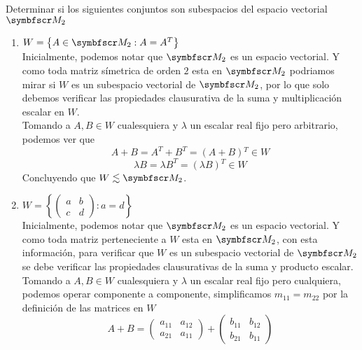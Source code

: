 \item Determinar si los siguientes conjuntos son subespacios del espacio vectorial \(\fm_2\)
    \begin{enumerate}[label=\listAlph]
        \item \(W = \left\{ A \in \fm_2 : A = A^T\right\}\) \\
            Inicialmente, podemos notar que \(\fm_2\) es un espacio vectorial.
            Y como toda matriz símetrica de orden \(2\) esta en \(\fm_2\) 
            podriamos mirar si \(W\) es un subespacio vectorial de \(\fm_2\), 
            por lo que solo debemos verificar las propiedades clausurativa de la suma y multiplicación escalar en \(W\). \\
            Tomando a \(A, B \in W\) cualesquiera y \(\lambda\) un escalar real fijo pero arbitrario, podemos ver que 
            \[
                A + B = A^T + B^T = \left(A + B\right){}^T \in W
            \]
            \[
                \lambda B = \lambda B^T = \left(\lambda B\right){}^T \in W
            \]
            Concluyendo que \(W \lesssim \fm_2\).
        \item \(W = \left\{ \begin{pmatrix}a & b \\ c & d\end{pmatrix}: a = d \right\}\) \\
            Inicialmente, podemos notar que \(\fm_2\) es un espacio vectorial.
            Y como toda matriz perteneciente a \(W\) esta en \(\fm_2\), 
            con esta información, para verificar que \(W\) es un subespacio vectorial de \(\fm_2\)
            se debe verificar las propiedades clausurativas de la suma y producto escalar. \\
            Tomando a \(A, B \in W\) cualesquiera y \(\lambda\) un escalar real fijo pero cualquiera, 
            podemos operar componente a componente, simplificamos \(m_{11} = m_{22}\) por la definición de las matrices en \(W\)
            \[
                A + B =
                \begin{pmatrix}
                    a_{11} & a_{12} \\
                    a_{21} & a_{11}
                \end{pmatrix}
                +
                \begin{pmatrix}
                    b_{11} & b_{12} \\
                    b_{21} & b_{11}
                \end{pmatrix}
\]
\end{enumerate}
